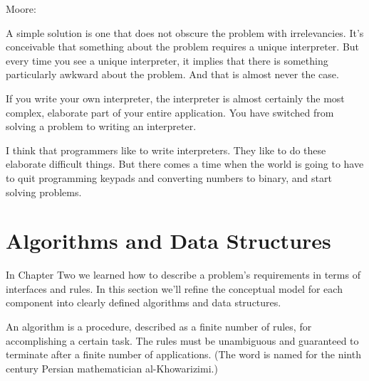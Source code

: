 \bigskip
\blackline{2ex}
Moore:

\begin{tfquot}
A simple solution is one that does not obscure the problem with irrelevancies.
It's conceivable that something about the problem requires a unique
interpreter. But every time you see a unique interpreter, it implies that
there is something particularly awkward about the problem. And that is
almost never the case.

If you write your own interpreter, the interpreter is almost certainly the
most complex, elaborate part of your entire application. You have switched
from solving a problem to writing an interpreter.

I think that programmers like to write interpreters. They like to do these
elaborate difficult things. But there comes a time when the world is going
to have to quit programming keypads and converting numbers to binary,
and start solving problems.
\end{tfquot}
\blackline{1ex}

\section{Algorithms and Data Structures}

In Chapter Two we learned how to describe a problem's requirements in
terms of interfaces and rules. In this section we'll refine the conceptual
model for each component into clearly defined algorithms and data
structures.

An algorithm is a procedure, described as a finite number of rules,
for accomplishing a certain task. The rules must be unambiguous and
guaranteed to terminate after a finite number of applications. (The word
is named for the ninth century Persian mathematician al-Khowarizimi.)

